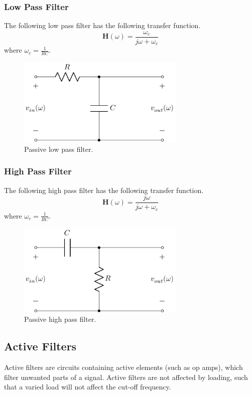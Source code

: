 \documentclass{article}
\begin{document}
\subsubsection{Low Pass Filter}
The following low pass filter has the following transfer function.
\begin{equation*}
    \symbf{H}(\omega) = \frac{\omega_c}{j\omega + \omega_c}
\end{equation*}
where \(\displaystyle \omega_c = \frac{1}{RC}\).
\begin{figure}[H]
    \centering
    \includegraphics[width = 8cm, keepaspectratio = true]{figures/passive_low_pass_filter.pdf}
    \caption{Passive low pass filter.}
\end{figure}
\subsubsection{High Pass Filter}
The following high pass filter has the following transfer function.
\begin{equation*}
    \symbf{H}(\omega) = \frac{j\omega}{j\omega + \omega_c}
\end{equation*}
where \(\displaystyle \omega_c = \frac{1}{RC}\).
\begin{figure}[H]
    \centering
    \includegraphics[width = 8cm, keepaspectratio = true]{figures/passive_high_pass_filter.pdf}
    \caption{Passive high pass filter.}
\end{figure}
\subsection{Active Filters}
Active filters are circuits containing active elements (such as op amps),
which filter unwanted parts of a signal.
Active filters are not affected by loading, such that a varied load will
not affect the cut-off frequency.
\end{document}
